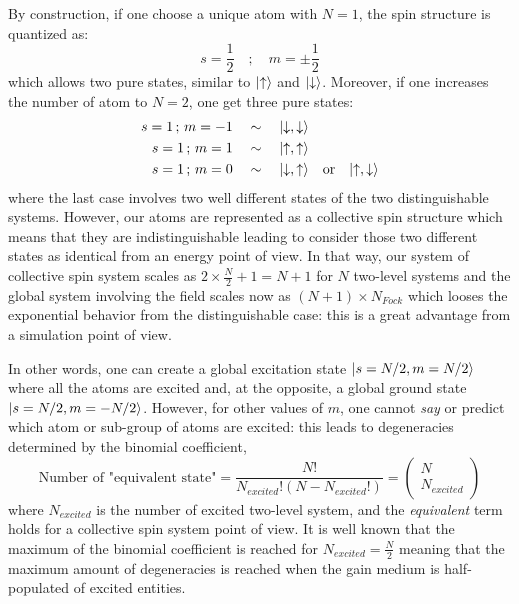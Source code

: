 \documentclass[11pt]{report}
\DeclarePairedDelimiter\ket{\lvert}{\rangle}
\begin{document}
By construction, if one choose a unique atom with $N=1$, the spin structure is quantized as:
\begin{equation}
s = \frac{1}{2} \quad; \quad m = \pm \frac{1}{2}
\end{equation}
which allows two pure states, similar to $\ket{\uparrow}$ and $\ket{\downarrow}$. Moreover, if one increases the number of atom to $N=2$, one get three pure states:
\begin{align*}
s = 1 \,;\, m = -1 \quad &\sim \quad \ket{\downarrow, \downarrow}\\
s = 1 \,;\, m = 1 \quad &\sim \quad \ket{\uparrow, \uparrow}\\
s = 1 \,;\, m = 0 \quad &\sim \quad \ket{\downarrow, \uparrow} \quad \textrm{or} \quad \ket{\uparrow, \downarrow}\\
\end{align*}
where the last case involves two well different states of the two distinguishable systems. However, our atoms are represented as a collective spin structure which means that they are indistinguishable leading to consider those two different states as identical from an energy point of view. In that way, our system of collective spin system scales as $2 \times \frac{N}{2} + 1 = N + 1$ for $N$ two-level systems and the global system involving the field scales now as $(N+1) \times N_{Fock}$ which looses the exponential behavior from the distinguishable case: this is a great advantage from a simulation point of view.

In other words, one can create a global excitation state $\ket{s = N/2, m = N/2}$ where all the atoms are excited and, at the opposite, a global ground state $\ket{s = N/2, m = -N/2}$. However, for other values of $m$, one cannot \textit{say} or predict which atom or sub-group of atoms are excited: this leads to degeneracies determined by the binomial coefficient,
\begin{equation}
\textrm{Number of "equivalent state"} = \frac{N!}{N_{excited}!(N-N_{excited}!)} = \begin{pmatrix}
N\\
N_{excited}
\end{pmatrix} 	
\end{equation}
where $N_{excited}$ is the number of excited two-level system, and the \textit{equivalent} term holds for a collective spin system point of view. It is well known that the maximum of the binomial coefficient is reached for $N_{excited} = \frac{N}{2}$ meaning that the maximum amount of degeneracies is reached when the gain medium is half-populated of excited entities.
\end{document}
